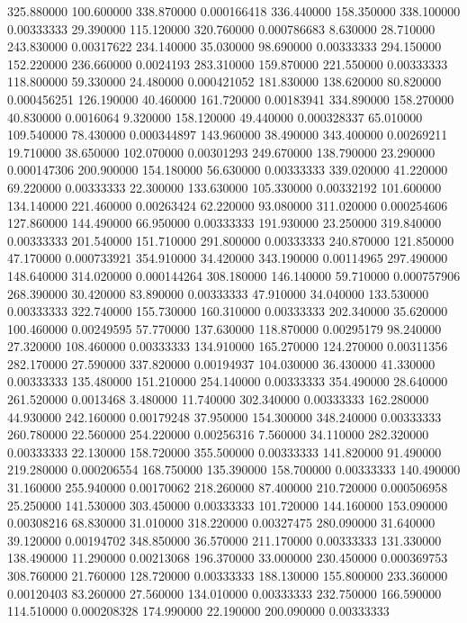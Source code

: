 325.880000	100.600000	338.870000	0.000166418
336.440000	158.350000	338.100000	0.00333333
29.390000	115.120000	320.760000	0.000786683
8.630000	28.710000	243.830000	0.00317622
234.140000	35.030000	98.690000	0.00333333
294.150000	152.220000	236.660000	0.0024193
283.310000	159.870000	221.550000	0.00333333
118.800000	59.330000	24.480000	0.000421052
181.830000	138.620000	80.820000	0.000456251
126.190000	40.460000	161.720000	0.00183941
334.890000	158.270000	40.830000	0.0016064
9.320000	158.120000	49.440000	0.000328337
65.010000	109.540000	78.430000	0.000344897
143.960000	38.490000	343.400000	0.00269211
19.710000	38.650000	102.070000	0.00301293
249.670000	138.790000	23.290000	0.000147306
200.900000	154.180000	56.630000	0.00333333
339.020000	41.220000	69.220000	0.00333333
22.300000	133.630000	105.330000	0.00332192
101.600000	134.140000	221.460000	0.00263424
62.220000	93.080000	311.020000	0.000254606
127.860000	144.490000	66.950000	0.00333333
191.930000	23.250000	319.840000	0.00333333
201.540000	151.710000	291.800000	0.00333333
240.870000	121.850000	47.170000	0.000733921
354.910000	34.420000	343.190000	0.00114965
297.490000	148.640000	314.020000	0.000144264
308.180000	146.140000	59.710000	0.000757906
268.390000	30.420000	83.890000	0.00333333
47.910000	34.040000	133.530000	0.00333333
322.740000	155.730000	160.310000	0.00333333
202.340000	35.620000	100.460000	0.00249595
57.770000	137.630000	118.870000	0.00295179
98.240000	27.320000	108.460000	0.00333333
134.910000	165.270000	124.270000	0.00311356
282.170000	27.590000	337.820000	0.00194937
104.030000	36.430000	41.330000	0.00333333
135.480000	151.210000	254.140000	0.00333333
354.490000	28.640000	261.520000	0.0013468
3.480000	11.740000	302.340000	0.00333333
162.280000	44.930000	242.160000	0.00179248
37.950000	154.300000	348.240000	0.00333333
260.780000	22.560000	254.220000	0.00256316
7.560000	34.110000	282.320000	0.00333333
22.130000	158.720000	355.500000	0.00333333
141.820000	91.490000	219.280000	0.000206554
168.750000	135.390000	158.700000	0.00333333
140.490000	31.160000	255.940000	0.00170062
218.260000	87.400000	210.720000	0.000506958
25.250000	141.530000	303.450000	0.00333333
101.720000	144.160000	153.090000	0.00308216
68.830000	31.010000	318.220000	0.00327475
280.090000	31.640000	39.120000	0.00194702
348.850000	36.570000	211.170000	0.00333333
131.330000	138.490000	11.290000	0.00213068
196.370000	33.000000	230.450000	0.000369753
308.760000	21.760000	128.720000	0.00333333
188.130000	155.800000	233.360000	0.00120403
83.260000	27.560000	134.010000	0.00333333
232.750000	166.590000	114.510000	0.000208328
174.990000	22.190000	200.090000	0.00333333
